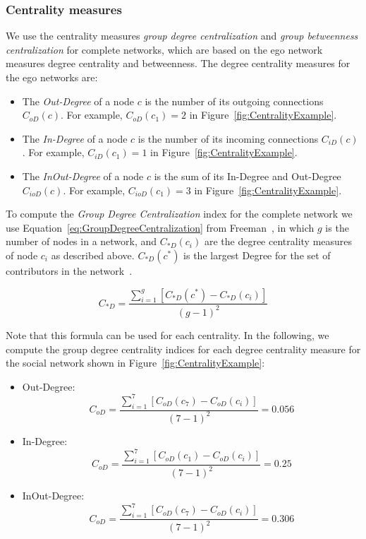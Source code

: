 \subsubsection{Centrality measures}
We use the centrality measures \emph{group degree centralization} and
\emph{group betweenness centralization} for complete networks, which are based on
the ego network measures degree centrality and betweenness. The degree
centrality measures for the ego networks are:

\begin{itemize}
  \item The \emph{Out-Degree} of a node $c$ is the
  number of its outgoing connections $C_{oD}(c)$. For example, $C_{oD}(c_1)=2$ in 
  Figure~\ref{fig:CentralityExample}.
  
  \item The \emph{In-Degree} of a node $c$ is the
  number of its incoming connections $C_{iD}(c)$. For example, $C_{iD}(c_1)=1$ 
  in Figure~\ref{fig:CentralityExample}.
  
  \item The \emph{InOut-Degree} of a node $c$ is the sum of its In-Degree and
  Out-Degree $C_{ioD}(c)$. For example, $C_{ioD}(c_1)=3$
  in Figure~\ref{fig:CentralityExample}.
\end{itemize}

To compute the \emph{Group Degree Centralization} index for the complete network
we use Equation~\ref{eq:GroupDegreeCentralization} from
Freeman~\cite{Freeman:1979rl}, in which $g$ is the number of nodes in a network,
and $C_{*D}(c_i)$ are the degree centrality measures of node $c_i$ as
described above. $C_{*D}(c^*)$ is the largest Degree for the set of
contributors in the network~\cite{Gloor:2003cikm,hinds:cscw:2006}.

\begin{equation}
\displaystyle C_{*D} =  \frac{\sum_{i=1}^g[C_{*D}(c^*) - C_{*D}(c_i)]}{(g-1)^2}
\label{eq:GroupDegreeCentralization}
\end{equation}

Note that this formula can be used for each centrality. In the following, we compute the group degree centrality indices for each degree centrality measure for the social network shown in Figure~\ref{fig:CentralityExample}:
\begin{itemize}
\item Out-Degree:
\begin{equation}
\displaystyle C_{oD} = \frac{\sum_{i=1}^7[C_{oD}(c_7) - C_{oD}(c_i)]}{(7-1)^2} = 0.056
\end{equation}
\item In-Degree:
\begin{equation}
\displaystyle C_{oD} = \frac{\sum_{i=1}^7[C_{oD}(c_1) - C_{oD}(c_i)]}{(7-1)^2} = 0.25
\end{equation}
\item InOut-Degree:
\begin{equation}
\displaystyle C_{oD} = \frac{\sum_{i=1}^7[C_{oD}(c_7) - C_{oD}(c_i)]}{(7-1)^2} = 0.306
\end{equation}
\end{itemize}

